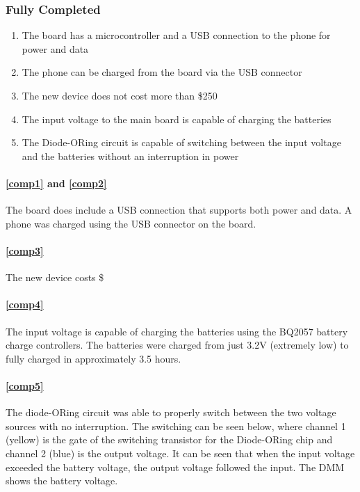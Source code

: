 \documentclass{article}
\numberwithin{figure}{section}
\numberwithin{equation}{section}
\begin{document}
{\subsubsection{Fully Completed}\label{vv-completed}
\begin{enumerate}[align=left,leftmargin=*,labelindent=0em,label=\textbf{Item \thesubsubsection.\arabic*.},itemindent=0em]
    \item \label{comp1} The board has a microcontroller and a USB connection to the phone for power and data
    \item \label{comp2} The phone can be charged from the board via the USB connector
    \item \label{comp3} The new device does not cost more than \$250
    \item \label{comp4} The input voltage to the main board is capable of charging the batteries
    \item \label{comp5} The Diode-ORing circuit is capable of switching between the input voltage and the batteries without an interruption in power
\end{enumerate}

\paragraph{\ref{comp1} and \ref{comp2}}
The board does include a USB connection that supports both power and data. A phone was charged using the USB connector on the board.

\paragraph{\ref{comp3}}
The new device costs \$%


\paragraph{\ref{comp4}}
The input voltage is capable of charging the batteries using the BQ2057 battery charge controllers. The batteries were charged from just 3.2V (extremely low) to fully charged in approximately 3.5 hours. %

\paragraph{\ref{comp5}}
The diode-ORing circuit was able to properly switch between the two voltage sources with no interruption. The switching can be seen below, where channel 1 (yellow) is the gate of the switching transistor for the Diode-ORing chip and channel 2 (blue) is the output voltage. It can be seen that when the input voltage exceeded the battery voltage, the output voltage followed the input. The DMM shows the battery voltage.

}
\end{document}
